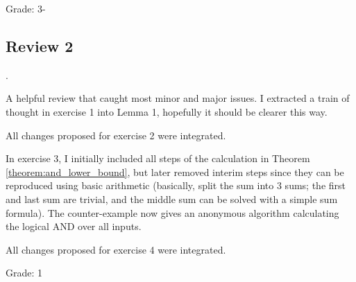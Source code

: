 Grade: 3-

\subsection{Review 2}.

A helpful review that caught most minor and major issues. I extracted a train of
thought in exercise 1 into Lemma 1, hopefully it should be clearer this way.

All changes proposed for exercise 2 were integrated.

In exercise 3, I initially
included all steps of the calculation in Theorem \ref{theorem:and_lower_bound},
but later removed interim steps since they can be reproduced using basic arithmetic
(basically, split the sum into 3 sums; the first and last sum are trivial, and
the middle sum can be solved with a simple sum formula). The counter-example
now gives an anonymous algorithm calculating the logical AND over all inputs.

All changes proposed for exercise 4 were integrated.

Grade: 1
